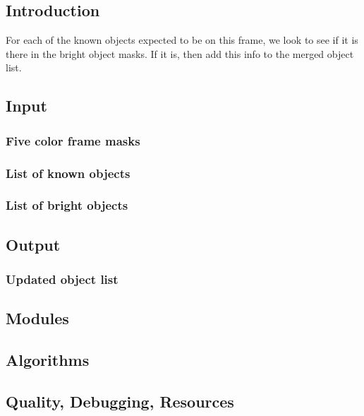 
\subsection{Introduction}

For each of the known objects expected to be on this frame, we look to see
if it is there in the bright object masks.  If it is, then add this info
to the merged object list.

\subsection{Input}

\subsubsection{Five color frame masks}
\subsubsection{List of known objects}
\subsubsection{List of bright objects}

\subsection{Output}

\subsubsection{Updated object list}

\subsection{Modules}

\subsection{Algorithms}

\subsection{Quality, Debugging, Resources}

